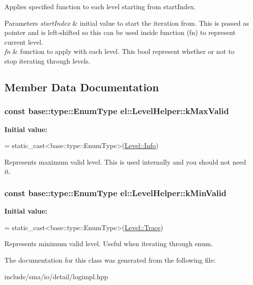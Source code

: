 Applies specified function to each level starting from start\-Index. 


\begin{DoxyParams}{Parameters}
{\em start\-Index} & initial value to start the iteration from. This is passed as pointer and is left-\/shifted so this can be used inside function (fn) to represent current level. \\
\hline
{\em fn} & function to apply with each level. This bool represent whether or not to stop iterating through levels. \\
\hline
\end{DoxyParams}


\subsection{Member Data Documentation}
\hypertarget{classel_1_1LevelHelper_aa06e80c65db5c336c4aad25872cf9a48}{
\subsubsection[{k\-Max\-Valid}]{\setlength{\rightskip}{0pt plus 5cm}const base\-::type\-::\-Enum\-Type el\-::\-Level\-Helper\-::k\-Max\-Valid\hspace{0.3cm}{\ttfamily [static]}}}\label{classel_1_1LevelHelper_aa06e80c65db5c336c4aad25872cf9a48}
{\bfseries Initial value\-:}
\begin{DoxyCode}
=
      \textcolor{keyword}{static\_cast<}base::type::EnumType\textcolor{keyword}{>}(\hyperlink{namespaceel_ab0ac6091262344c52dd2d3ad099e8e36a4059b0251f66a18cb56f544728796875}{Level::Info})
\end{DoxyCode}


Represents maximum valid level. This is used internally and you should not need it. 

\hypertarget{classel_1_1LevelHelper_a3ecfe43d5b242e9946bad7f61ea4d89d}{
\subsubsection[{k\-Min\-Valid}]{\setlength{\rightskip}{0pt plus 5cm}const base\-::type\-::\-Enum\-Type el\-::\-Level\-Helper\-::k\-Min\-Valid\hspace{0.3cm}{\ttfamily [static]}}}\label{classel_1_1LevelHelper_a3ecfe43d5b242e9946bad7f61ea4d89d}
{\bfseries Initial value\-:}
\begin{DoxyCode}
=
      \textcolor{keyword}{static\_cast<}base::type::EnumType\textcolor{keyword}{>}(\hyperlink{namespaceel_ab0ac6091262344c52dd2d3ad099e8e36add4ec0ac4e58f7c32a01244ae91150b1}{Level::Trace})
\end{DoxyCode}


Represents minimum valid level. Useful when iterating through enum. 



The documentation for this class was generated from the following file\-:\begin{DoxyCompactItemize}
\item 
include/sma/io/detail/logimpl.\-hpp\end{DoxyCompactItemize}

